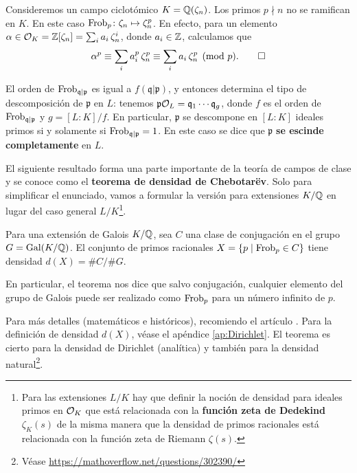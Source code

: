 \begin{ejemplo}
  Consideremos un campo ciclotómico $K = \mathbb{Q} (\zeta_n)$. Los primos $p \nmid n$
  no se ramifican en $K$. En este caso
  $\operatorname{Frob}_p\colon \zeta_n \mapsto \zeta_n^p$. En efecto, para un elemento
  $\alpha \in \mathcal{O}_K = \mathbb{Z} [\zeta_n] = \sum_i a_i \, \zeta_n^i$, donde
  $a_i \in \mathbb{Z}$, calculamos que
  \[ \alpha^p \equiv \sum_i a_i^p \, \zeta_n^p \equiv
     \sum_i a_i \, \zeta_n^p \pmod{p}. \qedhere \]
\end{ejemplo}

El orden de $\operatorname{Frob}_{\mathfrak{q}|\mathfrak{p}}$ es igual a
$f (\mathfrak{q}|\mathfrak{p})$, y entonces determina el tipo de
descomposición de $\mathfrak{p}$ en $L$: tenemos
$\mathfrak{p} \mathcal{O}_L = \mathfrak{q}_1\cdots \mathfrak{q}_g$, donde $f$
es el orden de $\operatorname{Frob}_{\mathfrak{q}|\mathfrak{p}}$ y $g = [L:K]/f$.
En particular, $\mathfrak{p}$ se descompone en $[L:K]$ ideales primos
si y solamente si $\operatorname{Frob}_{\mathfrak{q}|\mathfrak{p}} = 1$. En este caso se
dice que $\mathfrak{p}$ \textbf{se escinde completamente} en $L$.

\vspace{1em}

El siguiente resultado forma una parte importante de la teoría de campos de
clase y se conoce como el \textbf{teorema de densidad de Chebotarëv}.
Solo para simplificar el enunciado, vamos a formular la versión para extensiones
$K/\mathbb{Q}$ en lugar del caso general $L/K$\footnote{Para las extensiones $L/K$ hay
  que definir la noción de densidad para ideales primos en $\mathcal{O}_K$ que está
  relacionada con la \textbf{función zeta de Dedekind} $\zeta_K (s)$ de la misma
  manera que la densidad de primos racionales está relacionada con la función
  zeta de Riemann $\zeta (s)$.}.

\begin{teorema}
  Para una extensión de Galois $K/\mathbb{Q}$, sea $C$ una clase de conjugación en
  el grupo $G = \operatorname{Gal} (K/\mathbb{Q})$. El conjunto de primos racionales
  $X = \{ p \mid \operatorname{Frob}_p \in C \}$ tiene densidad $d (X) = \#C/\#G$.
\end{teorema}

En particular, el teorema nos dice que salvo conjugación, cualquier elemento del
grupo de Galois puede ser realizado como $\operatorname{Frob}_p$ para un número infinito de
$p$.

Para más detalles (matemáticos e históricos), recomiendo el artículo
\cite{Lenstra-Stevenhagen-1996}. Para la definición de densidad $d (X)$,
véase el apéndice \ref{ap:Dirichlet}. El teorema es cierto para la densidad de
Dirichlet (analítica) y también para la densidad natural\footnote{Véase
  \url{https://mathoverflow.net/questions/302390/}}.

